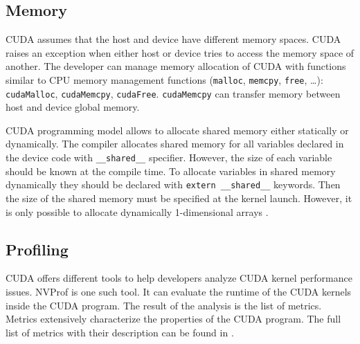 
\subsection{Memory}

CUDA assumes that the host and device have different memory spaces.
CUDA raises an exception when either host or device tries to access the memory space of another.
The developer can manage memory allocation of CUDA with functions similar to CPU memory management functions (\texttt{malloc}, \texttt{memcpy}, \texttt{free}, …): \texttt{cudaMalloc}, \texttt{cudaMemcpy}, \texttt{cudaFree}.
\texttt{cudaMemcpy} can transfer memory between host and device global memory.

CUDA programming model allows to allocate shared memory either statically or dynamically.
The compiler allocates shared memory for all variables declared in the device code with \texttt{\_\_shared\_\_} specifier.
However, the size of each variable should be known at the compile time.
To allocate variables in shared memory dynamically they should be declared with \texttt{extern \_\_shared\_\_} keywords.
Then the size of the shared memory must be specified at the kernel launch.
However, it is only possible to allocate dynamically 1-dimensional arrays \cite{CUDAProgramming}.

\subsection{Profiling}

CUDA offers different tools to help developers analyze CUDA kernel performance issues.
NVProf is one such tool.
It can evaluate the runtime of the CUDA kernels inside the CUDA program.
The result of the analysis is the list of metrics.
Metrics extensively characterize the properties of the CUDA program.
The full list of metrics with their description can be found in \cite{NVProf}.

